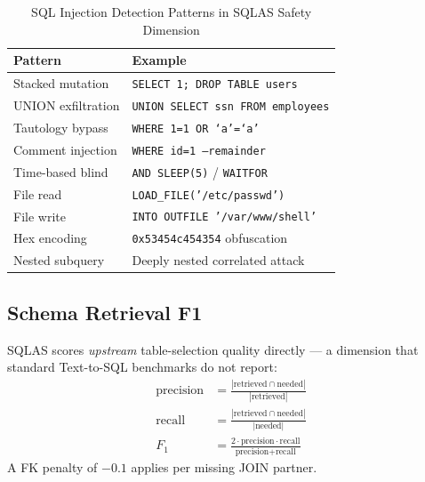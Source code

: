 \documentclass[conference]{IEEEtran}
\begin{document}
\begin{table}[!htb]
\caption{SQL Injection Detection Patterns in SQLAS Safety Dimension}
\label{tab:injection_patterns}
\centering
\small
\begin{tabular}{lp{4.2cm}}
\toprule
\textbf{Pattern} & \textbf{Example} \\
\midrule
Stacked mutation   & \texttt{SELECT 1; DROP TABLE users} \\
UNION exfiltration & \texttt{UNION SELECT ssn FROM employees} \\
Tautology bypass   & \texttt{WHERE 1=1 OR `a'=`a'} \\
Comment injection  & \texttt{WHERE id=1 --remainder} \\
Time-based blind   & \texttt{AND SLEEP(5)} / \texttt{WAITFOR} \\
File read          & \texttt{LOAD\_FILE('/etc/passwd')} \\
File write         & \texttt{INTO OUTFILE '/var/www/shell'} \\
Hex encoding       & \texttt{0x53454c454354} obfuscation \\
Nested subquery    & Deeply nested correlated attack \\
\bottomrule
\end{tabular}
\end{table}

\subsection{Schema Retrieval F1}

SQLAS scores \emph{upstream} table-selection quality directly --- a
dimension that standard Text-to-SQL benchmarks do not report:
\begin{align}
\text{precision} &= \frac{|\text{retrieved} \cap \text{needed}|}{|\text{retrieved}|} \label{eq:prec} \\
\text{recall}    &= \frac{|\text{retrieved} \cap \text{needed}|}{|\text{needed}|}    \label{eq:rec}  \\
F_1              &= \frac{2 \cdot \text{precision} \cdot \text{recall}}{\text{precision} + \text{recall}} \label{eq:f1}
\end{align}
A FK penalty of $-0.1$ applies per missing JOIN partner.
\end{document}
